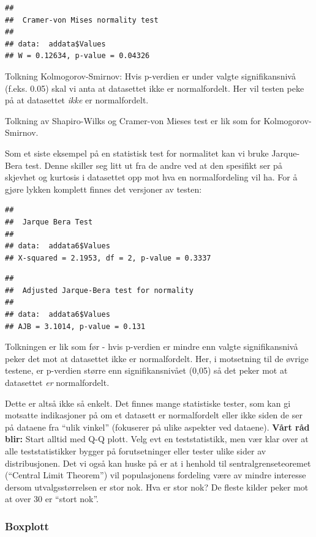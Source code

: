 \documentclass[
]{article}
\begin{document}
\begin{verbatim}
## 
##  Cramer-von Mises normality test
## 
## data:  addata$Values
## W = 0.12634, p-value = 0.04326
\end{verbatim}

Tolkning Kolmogorov-Smirnov: Hvis p-verdien er under valgte
signifikansnivå (f.eks. 0.05) skal vi anta at datasettet ikke er
normalfordelt. Her vil testen peke på at datasettet \emph{ikke} er
normalfordelt.

Tolkning av Shapiro-Wilks og Cramer-von Mieses test er lik som for
Kolmogorov-Smirnov.

Som et siste eksempel på en statistisk test for normalitet kan vi bruke
Jarque-Bera test. Denne skiller seg litt ut fra de andre ved at den
spesifikt ser på skjevhet og kurtosis i datasettet opp mot hva en
normalfordeling vil ha. For å gjøre lykken komplett finnes det versjoner
av testen:

\begin{verbatim}
## 
##  Jarque Bera Test
## 
## data:  addata6$Values
## X-squared = 2.1953, df = 2, p-value = 0.3337
\end{verbatim}

\begin{verbatim}
## 
##  Adjusted Jarque-Bera test for normality
## 
## data:  addata6$Values
## AJB = 3.1014, p-value = 0.131
\end{verbatim}

Tolkningen er lik som før - hvis p-verdien er mindre enn valgte
signifikansnivå peker det mot at datasettet ikke er normalfordelt. Her,
i motsetning til de øvrige testene, er p-verdien større enn
signifikansnivået (0,05) så det peker mot at datasettet \emph{er}
normalfordelt.

Dette er altså ikke så enkelt. Det finnes mange statistiske tester, som
kan gi motsatte indikasjoner på om et datasett er normalfordelt eller
ikke siden de ser på dataene fra ``ulik vinkel'' (fokuserer på ulike
aspekter ved dataene). \textbf{Vårt råd blir:} Start alltid med Q-Q
plott. Velg evt en teststatistikk, men vær klar over at alle
teststatistikker bygger på forutsetninger eller tester ulike sider av
distribusjonen. Det vi også kan huske på er at i henhold til
sentralgrenseteoremet (``Central Limit Theorem'') vil populasjonens
fordeling være av mindre interesse dersom utvalgsstørrelsen er stor nok.
Hva er stor nok? De fleste kilder peker mot at over 30 er ``stort nok''.

\hypertarget{boxplott}{%
\subsubsection{Boxplott}\label{boxplott}}
\end{document}

